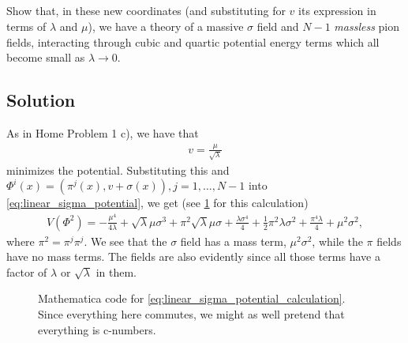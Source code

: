 \subsection{}
Show that, in these new coordinates (and substituting for $v$ its expression in terms of $\lambda$ and $\mu$), we have a theory of a massive $\sigma$ field and $N - 1$ \emph{massless} pion fields, interacting through cubic and quartic potential energy terms which all become small as $\lambda \to 0$.

\subsection*{Solution}
As in Home Problem 1 c), we have that
\begin{align*}
	v = \frac{\mu}{\sqrt{\lambda}}
\end{align*}
minimizes the potential. Substituting this and $\Phi^i(x) = (\pi^j(x), v + \sigma(x)), j = 1, \dots, N-1$ into \cref{eq:linear_sigma_potential}, we get (see \cref{fig:linear_sigma_potential_calculation} for this calculation)
\begin{align}\label{eq:linear_sigma_potential_calculation}
	V(\Phi^2) = 
	-\frac{\mu ^4}{4 \lambda }+\sqrt{\lambda } \mu  \sigma ^3+\pi ^2 \sqrt{\lambda } \mu  \sigma +\frac{\lambda  \sigma ^4}{4}+\frac{1}{2} \pi ^2 \lambda  \sigma ^2+\frac{\pi ^4 \lambda }{4}+\mu ^2 \sigma ^2,
\end{align}
where $\pi^2 = \pi^j \pi^j$. We see that the $\sigma$ field has a mass term, $\mu^2 \sigma^2$, while the $\pi$ fields have no mass terms. The fields are also evidently  since all those terms have a factor of $\lambda$ or $\sqrt{\lambda}$ in them.
\begin{figure}[h]
	\centering
	\caption{Mathematica code for \cref{eq:linear_sigma_potential_calculation}. Since everything here commutes, we might as well pretend that everything is c-numbers.}
	\label{fig:linear_sigma_potential_calculation}
\end{figure}{}




